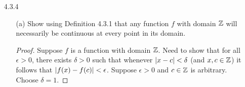 \documentclass[12pt,letterpaper]{article}
\begin{document}
\begin{itemize}[leftmargin=!,labelindent=5pt]
\begin{itemize}
                    If $f$ is continuous at $c \in A$, and if $g$ is continuous at $f(c) \in B$, then $g \circ f$ is continuous at $c$.
                    \begin{proof}
                        Suppose $\epsilon > 0$ is arbitrary.
                        Since $g$ is continuous at $f(c) \in B$, there exists a $\delta_1>0$ such that $\abs{g(f(x))-g(f(c))} < \epsilon$ whenever $\abs{f(x) - f(c)} < \delta_1$ (and $x \in A$ and $f(x) \in B$).
                        Since $f$ is continuous at $c \in A$, there exists a $\delta > 0$ such that $\abs{f(x) - f(c)} < \delta_1$ whenever $\abs{x-c} < \delta$ (and $x \in A$).
                        Combining both of the above parts, we see that for all $\epsilon > 0$, there exists a $\delta > 0$ such that $\abs{x-c} < \delta$ implies $\abs{f(x) - f(c)} < \delta_1$ which implies $\abs{g(f(x))-g(f(c))} < \epsilon$.
                        Thus, $g \circ f$ is continuous at $c$.
                    \end{proof}
                \item [(b)] Give another proof of this theorem using the sequential characterization of continuity (from Theorem 4.3.2 (iv)).
                    \begin{proof}
                        Assume that $(x_n) \to c$ (with $x_n \in A$).
                        Since $f$ is continuous at $c$, $f(x_n) \to f(c)$ by Theorem 4.3.2 (iv) (Characterizations of Continuity).
                        Since $g$ is continuous at $f(c)$, $g(f(x_n)) \to g(f(c))$ by Theorem 4.3.2 (iv).
                        Thus, $g \circ f$ is continuous at $c$.
                    \end{proof}
            \end{itemize}
        \item [4.3.4] 
            \begin{itemize}
                \item [(a)] Show using Definition 4.3.1 that any function $f$ with domain $\mathbb{Z}$ will necessarily be continuous at every point in its domain.
                    \begin{proof}
                        Suppose $f$ is a function with domain $\mathbb{Z}$.
                        Need to show that for all $\epsilon > 0$, there exists $\delta > 0$ such that whenever $\abs{x-c} < \delta$ (and $x,c \in \mathbb{Z}$) it follows that $\abs{f(x) - f(c)} < \epsilon$.
                        Suppose $\epsilon > 0$ and $c \in \mathbb{Z}$ is arbitrary.
                        Choose $\delta = 1$.

\end{proof}
\end{itemize}
\end{itemize}
\end{document}
